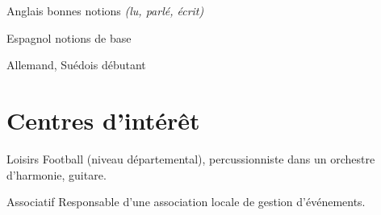 \documentclass[10pt,a4paper]{moderncv}
\begin{document}
\cvlanguage
	{Anglais}
	{bonnes notions \textnormal{\textit{(lu, parlé, écrit)}}}
	{}

\cvlanguage
	{Espagnol}
	{notions de base}
	{}

\cvlanguage
	{Allemand, Suédois}
	{débutant}
	{}


\section{Centres d'intérêt}

\cvline
	{Loisirs}
	{Football (niveau départemental), percussionniste dans un orchestre d'harmonie, guitare.}

\cvline
	{Associatif}
	{Responsable d'une association locale de gestion d'événements.}

\end{document}

